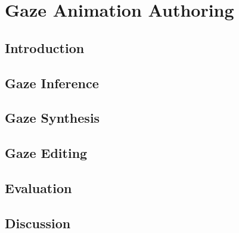 \pagestyle{deposit}

\chapter{Gaze Animation Authoring}
\label{cha:GazeAuthoring}

\section{Introduction}
\label{sec:GazeAuthoringIntro}
%

\section{Gaze Inference}
\label{sec:GazeInference}
%

\section{Gaze Synthesis}
\label{sec:GazeSynthesis}
%

\section{Gaze Editing}
\label{sec:GazeEditing}
%

\section{Evaluation}
\label{sec:GazeAuthoringEvaluation}
%

\section{Discussion}
\label{sec:GazeAuthoringDiscussion}
%
